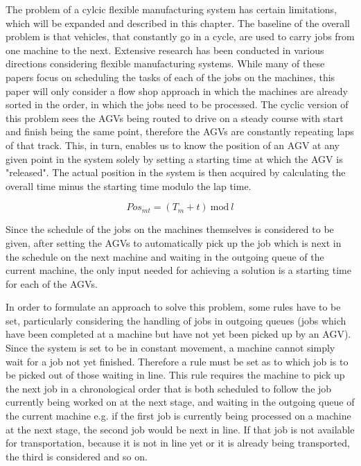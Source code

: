 
The problem of a cylcic flexible manufacturing system has certain limitations, which will be expanded and described in this chapter. The baseline
of the overall problem is that vehicles, that constantly go in a cycle, are used to carry jobs from one machine to the next. Extensive research 
has been conducted in various directions considering flexible manufacturing systems. While many of these papers focus on scheduling the tasks of each of
the jobs on the machines,
this paper will only consider
a flow shop approach in which the machines are already sorted in the order, in which the jobs need to be processed. The cyclic version of
this problem sees the AGVs being routed to drive on a steady course with start and finish being the same point, therefore the AGVs
are constantly repeating laps of that track. This, in turn, enables us to know the position of an AGV at any given point in the system solely by
setting a starting time at which the AGV is "released". The actual position in the system is then acquired by calculating the overall time minus
the starting time modulo the lap time.

\[
Pos_{m t} = (T_{m} + t)\>\mathrm{mod}\>l
\]

Since the schedule of the jobs on the machines themselves is considered to be given, after setting the AGVs to automatically pick up the job 
which is next in the schedule on the next machine and waiting in the outgoing queue of the current machine, the only input needed for achieving a solution is a starting time for each of the AGVs.

In order to formulate an approach to solve this problem, some rules have to be set, particularly considering the handling of
jobs in outgoing queues (jobs which have been completed at a machine but have not yet been picked up by an AGV). Since the system is set to be
in constant movement, a machine cannot simply wait for a job not yet finished. Therefore a rule must be set as to which job is to be picked out
of those waiting in line. This rule requires the machine to pick up the next job in a chronological order that is both scheduled to follow the job
currently being worked on at the next stage, and waiting in the outgoing queue of the current machine e.g. if the first job is currently being
processed on a machine at the next stage, the second job would be next in line. If that job is not available for transportation, because it is not in line yet
or it is already being transported, the third is considered and so on.

